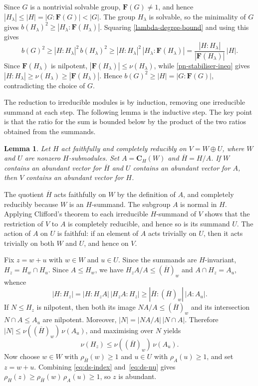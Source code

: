 \documentclass[10pt]{amsart}
\newtheorem{lemma}[theorem]{Lemma}
\theoremstyle{definition}
\renewcommand{\le}{\leqslant}
\renewcommand{\ge}{\geqslant}
\let\oldendproof\endproof
\renewenvironment{proof}[1][\proofname]{%
  \oldproof[\bfseries #1]%
}{\oldendproof}
\numberwithin{equation}{section}
\numberwithin{table}{section}
\begin{document}
\begin{proof}
Since $G$ is a nontrivial solvable group, $\mathbf{F}(G)\neq1$, and hence
$|H_\lambda|\le|H|=|G:\mathbf{F}(G)|<|G|$. The group $H_\lambda$ is solvable,
so the minimality of $G$ gives
$b(H_\lambda)^2\ge |H_\lambda:\mathbf{F}(H_\lambda)|$. Squaring
\eqref{lambda-degree-bound} and using this gives
$$b(G)^2
\ge |H:H_\lambda|^2\,b(H_\lambda)^2
\ge |H:H_\lambda|^2\,|H_\lambda:\mathbf{F}(H_\lambda)|
=\frac{|H:H_\lambda|}{|\mathbf{F}(H_\lambda)|}\,|H|.
$$
Since $\mathbf{F}(H_\lambda)$ is nilpotent,
$|\mathbf{F}(H_\lambda)|\le\nu(H_\lambda)$, while
\eqref{pn-stabiliser-ineq} gives
$|H:H_\lambda|\ge\nu(H_\lambda)\ge|\mathbf{F}(H_\lambda)|$. Hence
$b(G)^2\ge |H|=|G:\mathbf{F}(G)|$, contradicting the choice of $G$.
\end{proof}

The reduction to irreducible modules is by induction, removing one irreducible
summand at each step. The following lemma is the inductive step. The key point is that the
ratio for the sum is bounded below by the product of the two ratios obtained
from the summands.

\begin{lemma}\label{lem:direct-sum}
Let $H$ act faithfully and completely reducibly on $V=W\oplus U$, where $W$
and $U$ are nonzero $H$-submodules. Set $A=\mathbf{C}_H(W)$ and
$\overline{H}=H/A$. If $W$ contains an abundant vector for $\overline{H}$ and
$U$ contains an abundant vector for $A$, then $V$ contains an abundant vector
for $H$.
\end{lemma}

\begin{proof}
The quotient $\overline{H}$ acts faithfully on $W$ by
the definition of $A$, and completely reducibly because $W$ is an $H$-summand. The
subgroup $A$ is normal in $H$. Applying Clifford's theorem
\cite[Theorem~0.1]{ManzWolf93} to each irreducible $H$-summand of $V$ shows that
the restriction of $V$ to $A$ is completely reducible, and hence so is its summand
$U$. The action of $A$ on $U$ is faithful: if an element of $A$ acts trivially
on $U$, then it acts trivially on both $W$ and $U$, and hence on $V$.

Fix $z=w+u$ with $w\in W$ and $u\in U$. Since the summands are $H$-invariant,
$H_z=H_w\cap H_u$. Since $A\le H_w$, we have
$H_zA/A\le(\overline H)_w$ and
$A\cap H_z=A_u$, whence
\begin{equation}\label{eq:ds-index}
  |H:H_z|=|H:H_zA|\,|H_zA:H_z|\ge |\overline{H}:(\overline H)_w|\,|A:A_u|.
\end{equation}
If $N\le H_z$ is nilpotent, then both its image
$NA/A\le(\overline H)_w$ and its intersection
$N\cap A\le A_u$ are nilpotent. Moreover,
$|N|=|NA/A|\,|N\cap A|$. Therefore
$|N|\le\nu((\overline H)_w)\,\nu(A_u)$, and maximising over $N$ yields
\begin{equation}\label{eq:ds-nu}
  \nu(H_z)\le \nu((\overline H)_w)\,\nu(A_u).
\end{equation}
Now choose $w\in W$ with $\rho_{\overline{H}}(w)\ge1$ and $u\in U$ with $\rho_A(u)\ge1$,
and set $z=w+u$. Combining \eqref{eq:ds-index} and~\eqref{eq:ds-nu} gives
$\rho_H(z)\ge\rho_{\overline{H}}(w)\,\rho_A(u)\ge1$, so $z$ is abundant.
\end{proof}
\end{document}
